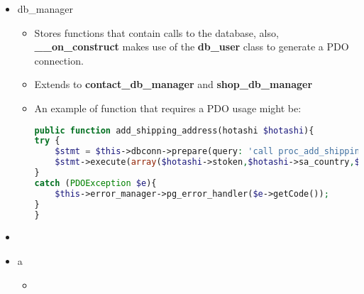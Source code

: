 \begin{flushleft}
\begin{itemize}
        \item db\_manager
        \begin{itemize}
            \item Stores functions that contain calls to the database, also, \textbf{\_\_on\_construct} makes use of the \textbf{db\_user}  class to generate a PDO connection.
            \item Extends to \textbf{contact\_db\_manager} and \textbf{shop\_db\_manager}
            \item \begin{flushleft}
                An example of function that requires a PDO usage might be:
                \begin{lstlisting}[language=php,label={lst:php_pdo_query_example}]
public function add_shipping_address(hotashi $hotashi){
try {
    $stmt = $this->dbconn->prepare(query: 'call proc_add_shipping_address_from_stoken(?,?,?,?,?,?,?);');
    $stmt->execute(array($hotashi->stoken,$hotashi->sa_country,$hotashi->sa_city,$hotashi->sa_pcode,$hotashi->sa_add1,$hotashi->sa_add2,$hotashi->sa_add3));
}
catch (PDOException $e){
    $this->error_manager->pg_error_handler($e->getCode());
}
}
                \end{lstlisting}
            \end{flushleft}
        \end{itemize}
        \item
    \end{itemize}
    \begin{itemize}
        \item a
        \begin{itemize}
            \item
        \end{itemize}
    \end{itemize}
\end{flushleft}